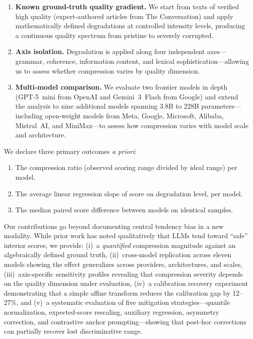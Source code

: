 \documentclass[11pt]{article}
\begin{document}
\begin{enumerate}[nosep]
    \item \textbf{Known ground-truth quality gradient.} We start from texts of verified high quality (expert-authored articles from The Conversation) and apply mathematically defined degradations at controlled intensity levels, producing a continuous quality spectrum from pristine to severely corrupted.
    \item \textbf{Axis isolation.} Degradation is applied along four independent axes---grammar, coherence, information content, and lexical sophistication---allowing us to assess whether compression varies by quality dimension.
    \item \textbf{Multi-model comparison.} We evaluate two frontier models in depth (GPT-5~mini from OpenAI and Gemini~3~Flash from Google) and extend the analysis to nine additional models spanning 3.8B to 228B parameters---including open-weight models from Meta, Google, Microsoft, Alibaba, Mistral~AI, and MiniMax---to assess how compression varies with model scale and architecture.
\end{enumerate}

We declare three primary outcomes \emph{a priori}:
\begin{enumerate}[nosep]
    \item The compression ratio (observed scoring range divided by ideal range) per model.
    \item The average linear regression slope of score on degradation level, per model.
    \item The median paired score difference between models on identical samples.
\end{enumerate}

Our contributions go beyond documenting central tendency bias in a new modality. While prior work has noted qualitatively that LLMs tend toward ``safe'' interior scores, we provide: (i)~a \emph{quantified} compression magnitude against an algebraically defined ground truth, (ii)~cross-model replication across eleven models showing the effect generalizes across providers, architectures, and scales, (iii)~axis-specific sensitivity profiles revealing that compression severity depends on the quality dimension under evaluation, (iv)~a calibration recovery experiment demonstrating that a simple affine transform reduces the calibration gap by 12--27\%, and (v)~a systematic evaluation of five mitigation strategies---quantile normalization, expected-score rescaling, auxiliary regression, asymmetry correction, and contrastive anchor prompting---showing that post-hoc corrections can partially recover lost discriminative range.
\end{document}
